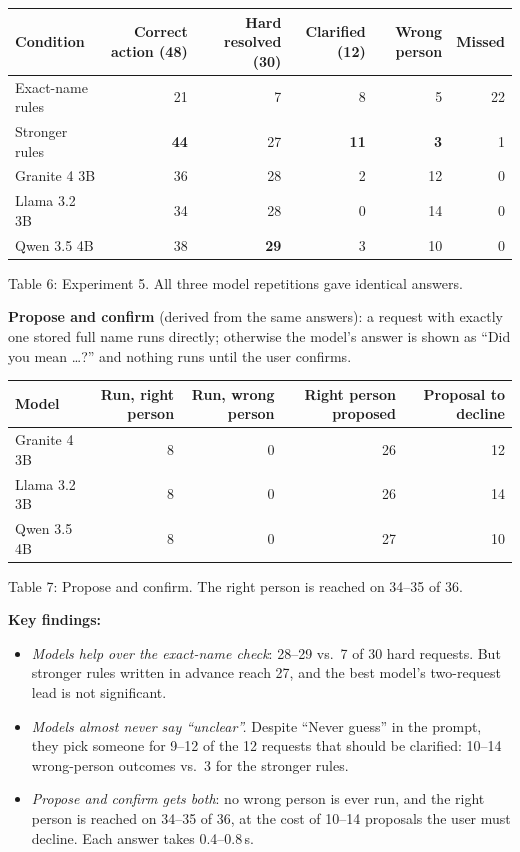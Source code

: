 \documentclass[11pt]{article}
\begin{document}
\begin{center}
\small
\begin{tabular}{@{}lrrrrr@{}}
\toprule
Condition & Correct action (48) & Hard resolved (30) & Clarified (12) & Wrong person & Missed \\
\midrule
Exact-name rules & 21 & 7 & 8 & 5 & 22 \\
Stronger rules & \textbf{44} & 27 & \textbf{11} & \textbf{3} & 1 \\
Granite 4 3B & 36 & 28 & 2 & 12 & 0 \\
Llama 3.2 3B & 34 & 28 & 0 & 14 & 0 \\
Qwen 3.5 4B & 38 & \textbf{29} & 3 & 10 & 0 \\
\bottomrule
\end{tabular}

Table 6: Experiment 5. All three model repetitions gave identical answers.
\end{center}

\textbf{Propose and confirm} (derived from the same answers): a request with
exactly one stored full name runs directly; otherwise the model's answer is shown
as ``Did you mean \ldots?'' and nothing runs until the user confirms.

\begin{center}
\small
\begin{tabular}{@{}lrrrr@{}}
\toprule
Model & Run, right person & Run, wrong person & Right person proposed & Proposal to decline \\
\midrule
Granite 4 3B & 8 & 0 & 26 & 12 \\
Llama 3.2 3B & 8 & 0 & 26 & 14 \\
Qwen 3.5 4B & 8 & 0 & 27 & 10 \\
\bottomrule
\end{tabular}

Table 7: Propose and confirm. The right person is reached on 34--35 of 36.
\end{center}

\textbf{Key findings:}
\begin{itemize}
  \item \emph{Models help over the exact-name check}: 28--29 vs.\ 7 of 30 hard
        requests. But stronger rules written in advance reach 27, and the best
        model's two-request lead is not significant.
  \item \emph{Models almost never say ``unclear''.} Despite ``Never guess'' in
        the prompt, they pick someone for 9--12 of the 12 requests that should
        be clarified: 10--14 wrong-person outcomes vs.\ 3 for the stronger rules.
  \item \emph{Propose and confirm gets both}: no wrong person is ever run, and
        the right person is reached on 34--35 of 36, at the cost of 10--14
        proposals the user must decline. Each answer takes 0.4--0.8\,s.
\end{itemize}
\end{document}
